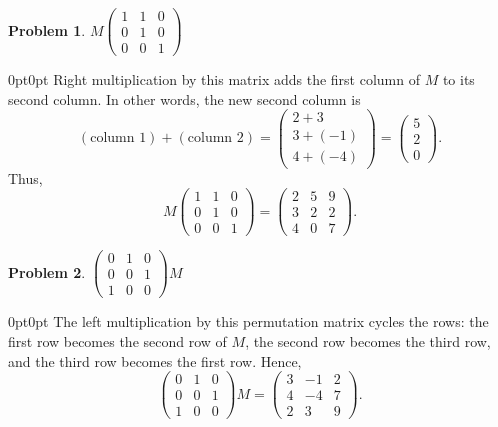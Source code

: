 \documentclass[12pt]{article}
\newenvironment{answer}
    {\begin{adjustwidth}{0pt}{0pt}}
    {\end{adjustwidth}}
\newtheorem{problem}{Problem}
\theoremstyle{remark}  %
\begin{document}
\begin{problem}
$
M
\begin{pmatrix}
1 & 1 & 0 \\
0 & 1 & 0 \\
0 & 0 & 1
\end{pmatrix}
$
\end{problem}
\begin{answer}
Right multiplication by this matrix adds the first column of \(M\) to its second column. In other words, the new second column is
\[
(\text{column 1})+(\text{column 2}) = \begin{pmatrix} 2+3 \\ 3+(-1) \\ 4+(-4) \end{pmatrix}=\begin{pmatrix} 5 \\ 2 \\ 0 \end{pmatrix}.
\]
Thus,
\[
M \begin{pmatrix}
1 & 1 & 0 \\
0 & 1 & 0 \\
0 & 0 & 1
\end{pmatrix}
=
\begin{pmatrix}
2 & 5 & 9 \\
3 & 2 & 2 \\
4 & 0 & 7
\end{pmatrix}.
\]
\end{answer}

\begin{problem}
$
\begin{pmatrix}
0 & 1 & 0 \\
0 & 0 & 1 \\
1 & 0 & 0
\end{pmatrix} M
$
\end{problem}
\begin{answer}
The left multiplication by this permutation matrix cycles the rows: the first row becomes the second row of \(M\), the second row becomes the third row, and the third row becomes the first row. Hence,
\[
\begin{pmatrix}
0 & 1 & 0 \\
0 & 0 & 1 \\
1 & 0 & 0
\end{pmatrix} M
=
\begin{pmatrix}
3 & -1 & 2 \\
4 & -4 & 7 \\
2 & 3 & 9
\end{pmatrix}.
\]
\end{answer}
\end{document}
